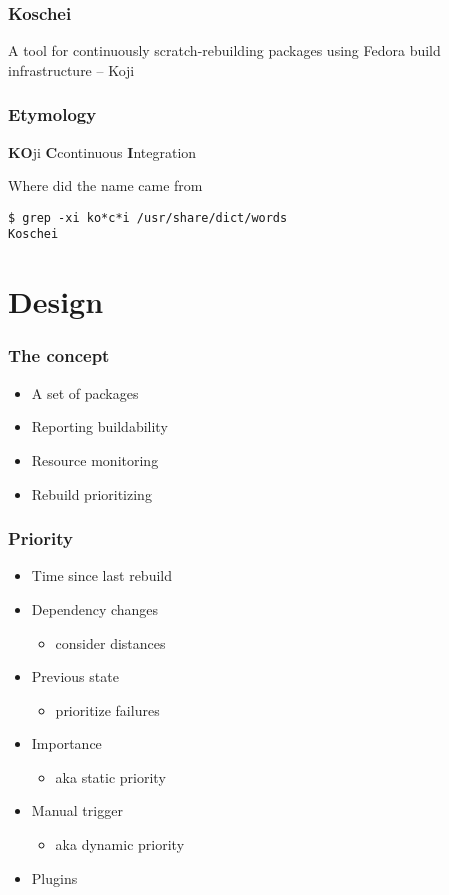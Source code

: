 \documentclass[pdftex,unicode,xcolor=table]{beamer}
\begin{document}
\Large
\begin{frame}
  \frametitle{Koschei}
  A tool for continuously scratch-rebuilding
  packages using Fedora build infrastructure -- Koji
\end{frame}

\large
\begin{frame}[fragile]
  \frametitle{Etymology}
\textbf{KO}ji \textbf{C}continuous \textbf{I}ntegration
\vspace{30 pt}
\begin{block}{Where did the name came from}
\begin{verbatim}
$ grep -xi ko*c*i /usr/share/dict/words
Koschei
\end{verbatim}
\end{block}
\end{frame}

\section{Design}
\begin{frame}
  \frametitle{The concept}
  \begin{itemize}
  \item A set of packages
  \item Reporting buildability
  \item Resource monitoring
  \item Rebuild prioritizing
  \end{itemize}
\end{frame}

\begin{frame}
  \frametitle{Priority}
  \begin{itemize}
    \item Time since last rebuild
    \item Dependency changes
    \begin{itemize}
      \item consider distances
    \end{itemize}
    \item Previous state
    \begin{itemize}
      \item prioritize failures
    \end{itemize}
    \item Importance
    \begin{itemize}
      \item aka static priority
    \end{itemize}
    \item Manual trigger
    \begin{itemize}
      \item aka dynamic priority
    \end{itemize}
    \item Plugins
  \end{itemize}
\end{frame}
\end{document}
